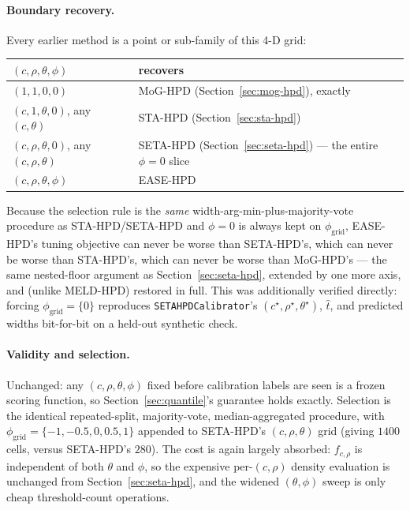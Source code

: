 \documentclass[11pt]{article}
\begin{document}
\paragraph{Boundary recovery.} Every earlier method is a point or sub-family of this 4-D grid:
\begin{center}
\begin{tabular}{@{}ll@{}}
\toprule
$(c,\rho,\theta,\phi)$ & recovers \\
\midrule
$(1,1,0,0)$ & MoG-HPD (Section~\ref{sec:mog-hpd}), exactly \\
$(c,1,\theta,0)$, any $(c,\theta)$ & STA-HPD (Section~\ref{sec:sta-hpd}) \\
$(c,\rho,\theta,0)$, any $(c,\rho,\theta)$ & SETA-HPD (Section~\ref{sec:seta-hpd}) --- the entire
$\phi=0$ slice \\
$(c,\rho,\theta,\phi)$ & EASE-HPD \\
\bottomrule
\end{tabular}
\end{center}
Because the selection rule is the \emph{same} width-arg-min-plus-majority-vote procedure as
STA-HPD/SETA-HPD and $\phi=0$ is always kept on $\phi_{\mathrm{grid}}$, EASE-HPD's tuning
objective can never be worse than SETA-HPD's, which can never be worse than STA-HPD's, which can
never be worse than MoG-HPD's --- the same nested-floor argument as Section~\ref{sec:seta-hpd},
extended by one more axis, and (unlike MELD-HPD) restored in full. This was additionally verified
directly: forcing $\phi_{\mathrm{grid}}=\{0\}$ reproduces \texttt{SETAHPDCalibrator}'s
$(c^\star,\rho^\star,\theta^\star)$, $\hat t$, and predicted widths bit-for-bit on a held-out
synthetic check.

\paragraph{Validity and selection.} Unchanged: any $(c,\rho,\theta,\phi)$ fixed before calibration
labels are seen is a frozen scoring function, so Section~\ref{sec:quantile}'s guarantee holds
exactly. Selection is the identical repeated-split, majority-vote, median-aggregated procedure,
with $\phi_{\mathrm{grid}}=\{-1,-0.5,0,0.5,1\}$ appended to SETA-HPD's $(c,\rho,\theta)$ grid
(giving $1400$ cells, versus SETA-HPD's $280$). The cost is again largely absorbed: $f_{c,\rho}$
is independent of both $\theta$ and $\phi$, so the expensive per-$(c,\rho)$ density evaluation is
unchanged from Section~\ref{sec:seta-hpd}, and the widened $(\theta,\phi)$ sweep is only cheap
threshold-count operations.
\end{document}
